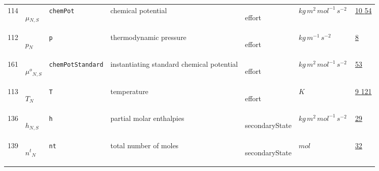 \begin{longtable}{|p{1cm}|p{2.5cm}|p{4.5cm}|p{8cm}|p{3.0cm}|p{3cm}|p{1cm}|}
            114
             & \hypertarget{"v:114"}{ $ {{\mu}}{_{N, S}} $}
             & \verb|chemPot|
             & chemical potential
             & \begin{lay}effort \end{lay}
             & $ kg \,m^{2} \,mol^{-1} \,s^{-2} \, $
             &                 \hyperlink{"e:10"}{ 10 }
                                 \hyperlink{"e:54"}{ 54 }
                 \\
            112
             & \hypertarget{"v:112"}{ $ {p}{_{N}} $}
             & \verb|p|
             & thermodynamic pressure
             & \begin{lay}effort \end{lay}
             & $ kg \,m^{-1} \,s^{-2} \, $
             &                 \hyperlink{"e:8"}{ 8 }
                 \\
            161
             & \hypertarget{"v:161"}{ $ {{\mu^o}}{_{N, S}} $}
             & \verb|chemPotStandard|
             & instantiating standard chemical potential
             & \begin{lay}effort \end{lay}
             & $ kg \,m^{2} \,mol^{-1} \,s^{-2} \, $
             &                 \hyperlink{"e:53"}{ 53 }
                 \\
            113
             & \hypertarget{"v:113"}{ $ {T}{_{N}} $}
             & \verb|T|
             & temperature
             & \begin{lay}effort \end{lay}
             & $ K \, $
             &                 \hyperlink{"e:9"}{ 9 }
                                 \hyperlink{"e:121"}{ 121 }
                 \\
            136
             & \hypertarget{"v:136"}{ $ {h}{_{N, S}} $}
             & \verb|h|
             & partial molar enthalpies
             & \begin{lay}secondaryState \end{lay}
             & $ kg \,m^{2} \,mol^{-1} \,s^{-2} \, $
             &                 \hyperlink{"e:29"}{ 29 }
                 \\
            139
             & \hypertarget{"v:139"}{ $ {{n^t}}{_{N}} $}
             & \verb|nt|
             & total number of moles
             & \begin{lay}secondaryState \end{lay}
             & $ mol \, $
             &                 \hyperlink{"e:32"}{ 32 }
                 \\

\end{longtable}
